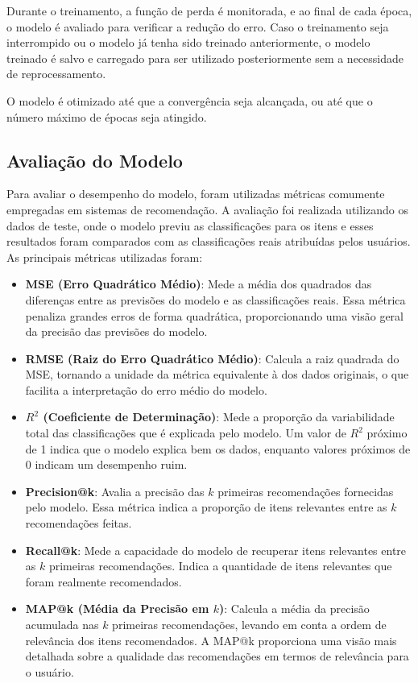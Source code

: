 \documentclass[sigconf]{acmart}
\begin{document}
Durante o treinamento, a função de perda é monitorada, e ao final de cada época, o modelo é avaliado para verificar a redução do erro. Caso o treinamento seja interrompido ou o modelo já tenha sido treinado anteriormente, o modelo treinado é salvo e carregado para ser utilizado posteriormente sem a necessidade de reprocessamento.

O modelo é otimizado até que a convergência seja alcançada, ou até que o número máximo de épocas seja atingido.

\subsection{Avaliação do Modelo}

Para avaliar o desempenho do modelo, foram utilizadas métricas comumente empregadas em sistemas de recomendação. A avaliação foi realizada utilizando os dados de teste, onde o modelo previu as classificações para os itens e esses resultados foram comparados com as classificações reais atribuídas pelos usuários. As principais métricas utilizadas foram:

\begin{itemize}
    \item \textbf{MSE (Erro Quadrático Médio)}: Mede a média dos quadrados das diferenças entre as previsões do modelo e as classificações reais. Essa métrica penaliza grandes erros de forma quadrática, proporcionando uma visão geral da precisão das previsões do modelo.
    
    \item \textbf{RMSE (Raiz do Erro Quadrático Médio)}: Calcula a raiz quadrada do MSE, tornando a unidade da métrica equivalente à dos dados originais, o que facilita a interpretação do erro médio do modelo.
    
    \item \textbf{\( R^2 \) (Coeficiente de Determinação)}: Mede a proporção da variabilidade total das classificações que é explicada pelo modelo. Um valor de \( R^2 \) próximo de 1 indica que o modelo explica bem os dados, enquanto valores próximos de 0 indicam um desempenho ruim.
    
    \item \textbf{Precision@k}: Avalia a precisão das \(k\) primeiras recomendações fornecidas pelo modelo. Essa métrica indica a proporção de itens relevantes entre as \(k\) recomendações feitas.
    
    \item \textbf{Recall@k}: Mede a capacidade do modelo de recuperar itens relevantes entre as \(k\) primeiras recomendações. Indica a quantidade de itens relevantes que foram realmente recomendados.
    
    \item \textbf{MAP@k (Média da Precisão em \(k\))}: Calcula a média da precisão acumulada nas \(k\) primeiras recomendações, levando em conta a ordem de relevância dos itens recomendados. A MAP@k proporciona uma visão mais detalhada sobre a qualidade das recomendações em termos de relevância para o usuário.
\end{itemize}
\end{document}
